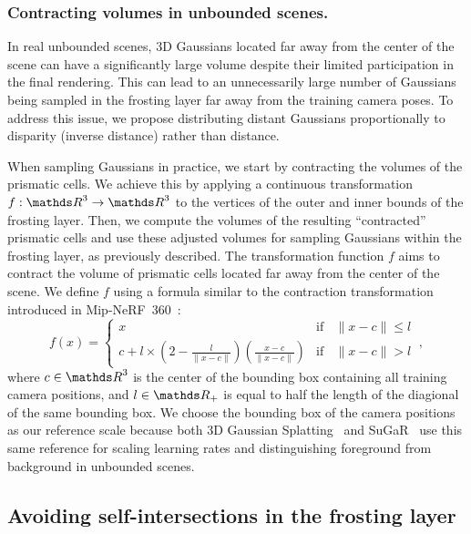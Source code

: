 \subsubsection{Contracting volumes in unbounded scenes.} In real unbounded scenes, 3D Gaussians located far away from the center of the scene can have a significantly large volume despite their limited participation in the final rendering. This can lead to an unnecessarily large number of Gaussians being sampled in the frosting layer far away from the training camera poses. To address this issue, we propose distributing distant Gaussians proportionally to disparity (inverse distance) rather than distance.

When sampling Gaussians in practice, we start by contracting the volumes of the prismatic cells. We achieve this by applying a continuous transformation $f:\IR^3 \rightarrow \IR^3$ to the vertices of the outer and inner bounds of the frosting layer. 
%
Then, we compute the volumes of the resulting ``contracted'' prismatic cells and use these adjusted volumes for sampling Gaussians within the frosting layer, as previously described. The transformation function $f$ aims to contract the volume of prismatic cells located far away from the center of the scene. We define $f$ using a formula similar to the contraction transformation introduced in Mip-NeRF~360~\cite{barron2022mipnerf360}:
\begin{equation}
    f(x) = \begin{cases}
        x & \text{if} \>\>\>\> \|x-c\| \leq l\\
        c + l \times \left(2 - \frac{l}{\|x-c\|}\right) \left(\frac{x-c}{\|x-c\|}\right) & \text{if} \>\>\>\> \|x-c\| > l
    \end{cases} \>,
    \label{eq:contraction}
\end{equation}
where $c\in \IR^3$ is the center of the bounding box containing all training camera positions, and $l\in\IR_+$ is equal to half the length of the diagional of the same bounding box. 
%
We choose the bounding box of the camera positions as our reference scale because both 3D Gaussian Splatting~\cite{kerbl3Dgaussians} and SuGaR~\cite{guedon2023sugar} use this same reference for scaling learning rates and distinguishing foreground from background in unbounded scenes.

\subsection{Avoiding self-intersections in the frosting layer}

